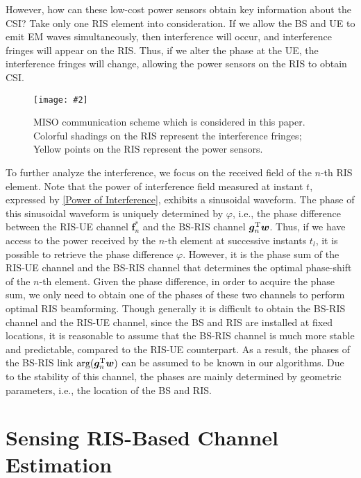\documentclass[12pt,draftclsnofoot,journal,onecolumn]{IEEEtran}
\theoremstyle{nonumberplain}
\def \arg {\text{arg}}
\newcommand{\myincludegraphics}[2][width=12cm]{\texttt{[image: \#2]}}
\begin{document}
    However, how can these low-cost power sensors obtain key information about the CSI? Take only one RIS element into consideration. If we allow the BS and UE to emit EM waves simultaneously, then interference will occur, and interference fringes will appear on the RIS. Thus, if we alter the phase at the UE, the interference fringes will change, allowing the power sensors on the RIS to obtain CSI. 
    \begin{figure}[htbp]
        \centering
        \myincludegraphics{figures/scheme.pdf}
        \caption{MISO communication scheme which is considered in this paper. Colorful shadings on the RIS represent the interference fringes; Yellow points on the RIS represent the power sensors.}
        \label{fig:scheme}
    \end{figure}
    To further analyze the interference, we focus on the received field of the $n$-th RIS element. Note that the power of interference field measured at instant $t$, expressed by \eqref{Power of Interference}, exhibits a sinusoidal waveform. The phase of this sinusoidal waveform is uniquely determined by $\varphi$, i.e., the phase difference between the RIS-UE channel ${\bm f}_n^{*}$ and the BS-RIS channel ${\bm g}_n^{\rm T}{\bm w}$. Thus, if we have access to the power received by the $n$-th element at successive instants $t_l$, it is possible to retrieve the phase difference $\varphi$. However, it is the phase sum of the RIS-UE channel and the BS-RIS channel that determines the optimal phase-shift of the $n$-th element. Given the phase difference, in order to acquire the phase sum, we only need to obtain one of the phases of these two channels to perform optimal RIS beamforming. Though generally it is difficult to obtain the BS-RIS channel and the RIS-UE channel, since the BS and RIS are installed at fixed locations, it is reasonable to assume that the BS-RIS channel is much more stable and predictable, compared to the RIS-UE counterpart. As a result, the phases of the BS-RIS link $\arg({\bm g}_n^{\rm T}{\bm w})$ can be assumed to be known in our algorithms. Due to the stability of this channel, the phases are mainly determined by geometric parameters, i.e., the location of the BS and RIS. 

\section{Sensing RIS-Based Channel Estimation}
\label{Sensing RIS-Based Channel Estimation}
\end{document}
